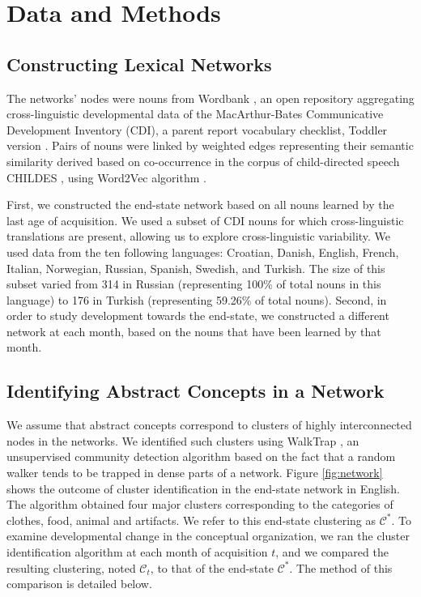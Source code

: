 \documentclass[11pt]{article}
\begin{document}
\section{Data and Methods}\label{data-and-methods}

\subsection{Constructing Lexical
Networks}\label{constructing-lexical-networks}

The networks' nodes were nouns from Wordbank \cite{frank2017}, an open
repository aggregating cross-linguistic developmental data of the
MacArthur-Bates Communicative Development Inventory (CDI), a parent
report vocabulary checklist, Toddler version \cite{fenson94}. Pairs of
nouns were linked by weighted edges representing their semantic
similarity derived based on co-occurrence in the corpus of
child-directed speech CHILDES \cite{macwhinney2014}, using Word2Vec
algorithm \cite{mikolov2013}.

First, we constructed the end-state network based on all nouns learned
by the last age of acquisition. We used a subset of CDI nouns for which
cross-linguistic translations are present, allowing us to explore
cross-linguistic variability. We used data from the ten following
languages: Croatian, Danish, English, French, Italian, Norwegian,
Russian, Spanish, Swedish, and Turkish. The size of this subset varied
from 314 in Russian (representing 100\% of total nouns in this language)
to 176 in Turkish (representing 59.26\% of total nouns). Second, in
order to study development towards the end-state, we constructed a
different network at each month, based on the nouns that have been
learned by that month.

\subsection{Identifying Abstract Concepts in a
Network}\label{identifying-abstract-concepts-in-a-network}

We assume that abstract concepts correspond to clusters of highly
interconnected nodes in the networks. We identified such clusters using
WalkTrap \cite{pons2006}, an unsupervised community detection algorithm
based on the fact that a random walker tends to be trapped in dense
parts of a network. Figure \ref{fig:network} shows the outcome of
cluster identification in the end-state network in English. The
algorithm obtained four major clusters corresponding to the categories
of clothes, food, animal and artifacts. We refer to this end-state
clustering as \(\mathcal{C}^*\). To examine developmental change in the
conceptual organization, we ran the cluster identification algorithm at
each month of acquisition \(t\), and we compared the resulting
clustering, noted \(\mathcal{C}_t\), to that of the end-state
\(\mathcal{C}^*\). The method of this comparison is detailed below.
\end{document}

